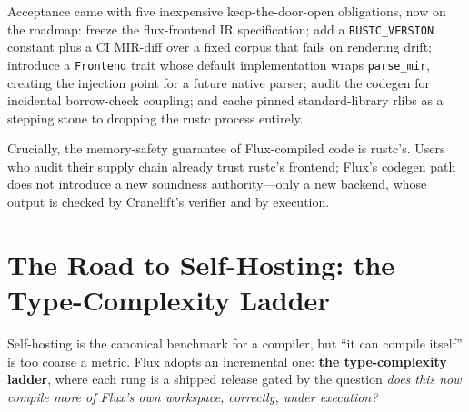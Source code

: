 Acceptance came with five inexpensive keep-the-door-open obligations, now on the roadmap: freeze the flux-frontend IR specification; add a \texttt{RUSTC\_VERSION} constant plus a CI MIR-diff over a fixed corpus that fails on rendering drift; introduce a \texttt{Frontend} trait whose default implementation wraps \texttt{parse\_mir}, creating the injection point for a future native parser; audit the codegen for incidental borrow-check coupling; and cache pinned standard-library rlibs as a stepping stone to dropping the rustc process entirely.

Crucially, the memory-safety guarantee of Flux-compiled code is rustc's. Users who audit their supply chain already trust rustc's frontend; Flux's codegen path does not introduce a new soundness authority---only a new backend, whose output is checked by Cranelift's verifier and by execution.


\section{The Road to Self-Hosting: the Type-Complexity Ladder}

Self-hosting is the canonical benchmark for a compiler, but ``it can compile itself'' is too coarse a metric. Flux adopts an incremental one: \textbf{the type-complexity ladder}, where each rung is a shipped release gated by the question \emph{does this now compile more of Flux's own workspace, correctly, under execution?}

